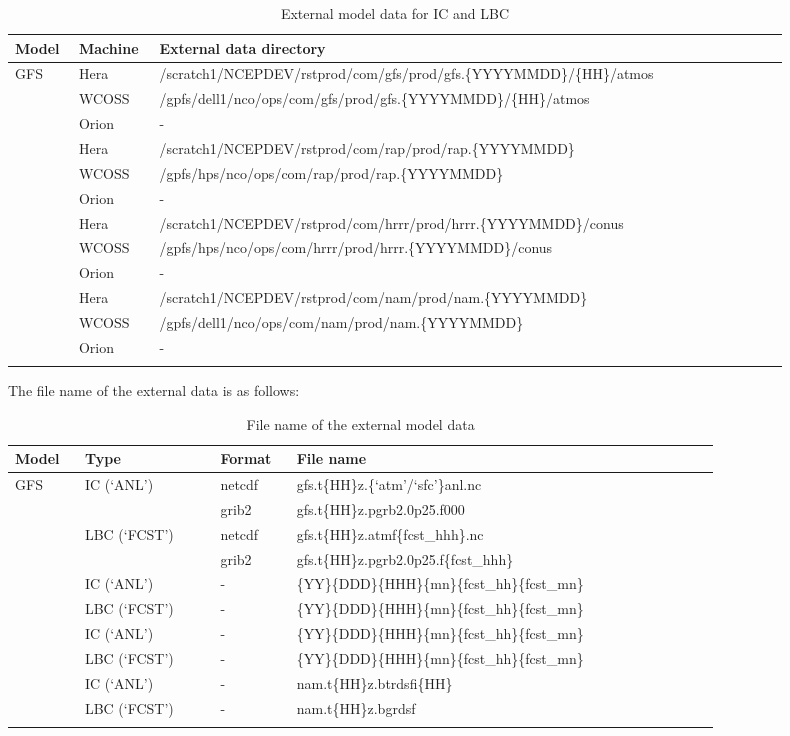 \documentclass[11pt,fleqn]{report}              %
\begin{document}
{
\fontsize{10}{12}\selectfont
\begin{longtable}{p{0.07\linewidth} | p{0.09\linewidth}  | p{0.74\linewidth} }
\hline
\hline
Model & Machine & External data directory \\
\hline
\multirow{3}{*}{GFS} & Hera & /scratch1/NCEPDEV/rstprod/com/gfs/prod/gfs.\{YYYYMMDD\}/\{HH\}/atmos \\
	& WCOSS & /gpfs/dell1/nco/ops/com/gfs/prod/gfs.\{YYYYMMDD\}/\{HH\}/atmos \\
	& Orion  & - \\
\hdashline
\multirow{3}{*}{RAP} & Hera &/scratch1/NCEPDEV/rstprod/com/rap/prod/rap.\{YYYYMMDD\} \\
	& WCOSS & /gpfs/hps/nco/ops/com/rap/prod/rap.\{YYYYMMDD\}  \\
	& Orion & - \\
\hdashline
\multirow{3}{*}{HRRR} & Hera &/scratch1/NCEPDEV/rstprod/com/hrrr/prod/hrrr.\{YYYYMMDD\}/conus \\
	& WCOSS & /gpfs/hps/nco/ops/com/hrrr/prod/hrrr.\{YYYYMMDD\}/conus \\
	& Orion & - \\
\hdashline
\multirow{3}{*}{NAM} & Hera & /scratch1/NCEPDEV/rstprod/com/nam/prod/nam.\{YYYYMMDD\} \\
	& WCOSS & /gpfs/dell1/nco/ops/com/nam/prod/nam.\{YYYYMMDD\} \\
	& Orion & - \\
\hline
\caption{External model data for IC and LBC}
\label{table:extrn_model_data_machine}
\end{longtable}
}

The file name of the external data is as follows:
{
\fontsize{10}{12}\selectfont
\begin{longtable}{p{0.08\linewidth} | p{0.16\linewidth}  | p{0.08\linewidth}  | p{0.5\linewidth} }
\hline
\hline
Model & Type & Format & File name \\
\hline
\multirow{4}{*}{GFS} & \multirow{2}{*}{IC (`ANL') } & netcdf & gfs.t\{HH\}z.\{`atm'/`sfc'\}anl.nc \\
 &	& grib2 & gfs.t\{HH\}z.pgrb2.0p25.f000 \\
\cline{2-4}
 & \multirow{2}{*}{LBC (`FCST')} & netcdf & gfs.t\{HH\}z.atmf\{fcst\_hhh\}.nc  \\
 &	& grib2 & gfs.t\{HH\}z.pgrb2.0p25.f\{fcst\_hhh\} \\
\hdashline
\multirow{2}{*}{RAP} & IC (`ANL') & - & \{YY\}\{DDD\}\{HHH\}\{mn\}\{fcst\_hh\}\{fcst\_mn\}   \\
 & LBC (`FCST') & - &  \{YY\}\{DDD\}\{HHH\}\{mn\}\{fcst\_hh\}\{fcst\_mn\}   \\
\hdashline
\multirow{2}{*}{HRRR} & IC (`ANL') & - & \{YY\}\{DDD\}\{HHH\}\{mn\}\{fcst\_hh\}\{fcst\_mn\}   \\
 & LBC (`FCST') & - &  \{YY\}\{DDD\}\{HHH\}\{mn\}\{fcst\_hh\}\{fcst\_mn\}   \\
\hdashline
\multirow{2}{*}{NAM} & IC (`ANL') & - & nam.t\{HH\}z.btrdsfi\{HH\}   \\
 & LBC (`FCST') & - &  nam.t\{HH\}z.bgrdsf   \\ 
\hline
\caption{File name of the external model data}
\label{table:extrn_filename}
\end{longtable}
}
\end{document}
